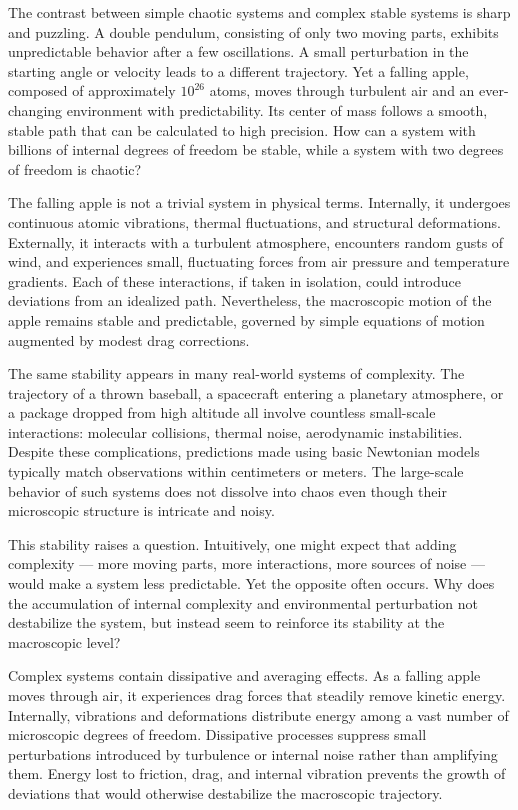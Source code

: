 The contrast between simple chaotic systems and complex stable systems is sharp and puzzling. A double pendulum, consisting of only two moving parts, exhibits unpredictable behavior after a few oscillations. A small perturbation in the starting angle or velocity leads to a different trajectory. Yet a falling apple, composed of approximately $10^{26}$ atoms, moves through turbulent air and an ever-changing environment with predictability. Its center of mass follows a smooth, stable path that can be calculated to high precision. How can a system with billions of internal degrees of freedom be stable, while a system with two degrees of freedom is chaotic?

The falling apple is not a trivial system in physical terms. Internally, it undergoes continuous atomic vibrations, thermal fluctuations, and structural deformations. Externally, it interacts with a turbulent atmosphere, encounters random gusts of wind, and experiences small, fluctuating forces from air pressure and temperature gradients. Each of these interactions, if taken in isolation, could introduce deviations from an idealized path. Nevertheless, the macroscopic motion of the apple remains stable and predictable, governed by simple equations of motion augmented by modest drag corrections.

The same stability appears in many real-world systems of complexity. The trajectory of a thrown baseball, a spacecraft entering a planetary atmosphere, or a package dropped from high altitude all involve countless small-scale interactions: molecular collisions, thermal noise, aerodynamic instabilities. Despite these complications, predictions made using basic Newtonian models typically match observations within centimeters or meters. The large-scale behavior of such systems does not dissolve into chaos even though their microscopic structure is intricate and noisy.

This stability raises a question. Intuitively, one might expect that adding complexity — more moving parts, more interactions, more sources of noise — would make a system less predictable. Yet the opposite often occurs. Why does the accumulation of internal complexity and environmental perturbation not destabilize the system, but instead seem to reinforce its stability at the macroscopic level?

Complex systems contain dissipative and averaging effects. As a falling apple moves through air, it experiences drag forces that steadily remove kinetic energy. Internally, vibrations and deformations distribute energy among a vast number of microscopic degrees of freedom. Dissipative processes suppress small perturbations introduced by turbulence or internal noise rather than amplifying them. Energy lost to friction, drag, and internal vibration prevents the growth of deviations that would otherwise destabilize the macroscopic trajectory.


